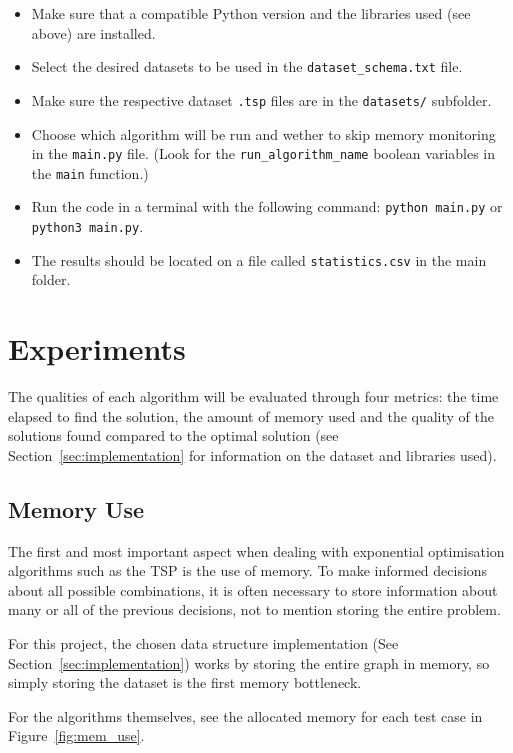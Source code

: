 \documentclass[12pt]{article}
\begin{document}
\begin{itemize}
  \item Make sure that a compatible Python version and the libraries used (see above) are installed.
  \item Select the desired datasets to be used in the \texttt{dataset\_schema.txt} file.
  \item Make sure the respective dataset \texttt{.tsp} files are in the \texttt{datasets/} subfolder.
  \item Choose which algorithm will be run and wether to skip memory monitoring in the \texttt{main.py} file. (Look for the \texttt{run\_algorithm\_name} boolean variables in the \texttt{main} function.)
  \item Run the code in a terminal with the following command: \texttt{python main.py} or \texttt{python3 main.py}.
  \item The results should be located on a file called \texttt{statistics.csv} in the main folder.
\end{itemize}

\section{Experiments} \label{sec:experiments}

The qualities of each algorithm will be evaluated through four metrics: the time elapsed 
to find the solution, the amount of memory used and the quality of the solutions found 
compared to the optimal solution (see Section~\ref{sec:implementation} for information 
on the dataset and libraries used).

\subsection{Memory Use} \label{sec:exp_memory}

The first and most important aspect when dealing with exponential optimisation algorithms such as 
the TSP is the use of memory. To make informed decisions about all possible combinations, 
it is often necessary to store information about many or all of the previous decisions, not to 
mention storing the entire problem.

For this project, the chosen data structure implementation (See Section~\ref{sec:implementation}) works by storing 
the entire graph in memory, so simply storing the dataset is the first memory bottleneck.

For the algorithms themselves, see the allocated memory for each test case in Figure~\ref{fig:mem_use}.
\end{document}
